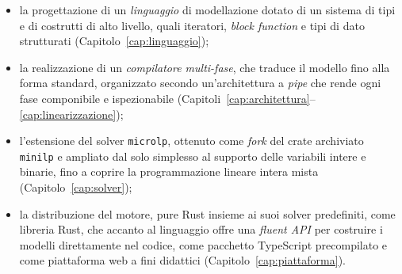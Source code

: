 \begin{itemize}
  \item la progettazione di un \emph{linguaggio} di modellazione dotato di un
        sistema di tipi e di costrutti di alto livello, quali iteratori,
        \emph{block function} e tipi di dato strutturati
        (Capitolo~\ref{cap:linguaggio});
  \item la realizzazione di un \emph{compilatore multi-fase}, che traduce il
        modello fino alla forma standard, organizzato secondo un'architettura a
        \emph{pipe} che rende ogni fase componibile e ispezionabile
        (Capitoli~\ref{cap:architettura}--\ref{cap:linearizzazione});
  \item l'estensione del solver \texttt{microlp}, ottenuto come \emph{fork} del
        crate archiviato \texttt{minilp} e ampliato dal solo simplesso al
        supporto delle variabili intere e binarie, fino a coprire la
        programmazione lineare intera mista (Capitolo~\ref{cap:solver});
  \item la distribuzione del motore, pure Rust insieme ai suoi solver
        predefiniti, come libreria Rust, che accanto al
        linguaggio offre una \emph{fluent API} per costruire i modelli
        direttamente nel codice, come pacchetto TypeScript precompilato e come
        piattaforma web a fini didattici (Capitolo~\ref{cap:piattaforma}).
\end{itemize}

